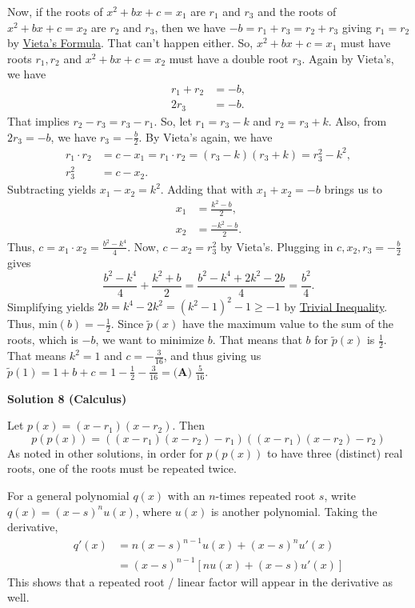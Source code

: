 \begin{enumerate}
 Now, if the roots of $x^2+bx+c=x_1$ are $r_1$ and $r_3$ and the roots of $x^2+bx+c=x_2$ are $r_2$ and $r_3$, then we have $-b = r_1+r_3 = r_2+r_3$ giving $r_1=r_2$ by \href{https://artofproblemsolving.com/wiki/index.php?title=Vieta\%27s\_Formula}{Vieta's Formula}. That can't happen either. So, $x^2+bx+c=x_1$ must have roots $r_1, r_2$ and $x^2+bx+c=x_2$ must have a double root $r_3$. Again by Vieta's, we have
 \begin{align*} r_1+r_2&=-b, \\ 2r_3&=-b. \end{align*}
That implies $r_2-r_3=r_3-r_1$. So, let $r_1=r_3-k$ and $r_2=r_3+k$. Also, from $2r_3=-b$, we have $r_3=-\frac{b}{2}$. By Vieta's again, we have
 \begin{align*} r_1\cdot r_2 &= c-x_1 = r_1\cdot r_2 = (r_3-k)(r_3+k) = r_3^2-k^2, \\ r_3^2&=c-x_2. \end{align*}
Subtracting yields $x_1-x_2=k^2$. Adding that with $x_1+x_2=-b$ brings us to
 \begin{align*} x_1 &= \frac{k^2-b}{2}, \\ x_2 &= \frac{-k^2-b}{2}. \end{align*}
Thus, $c=x_1\cdot x_2=\frac{b^2-k^4}{4}$. Now, $c-x_2 = r_3^2$ by Vieta's. Plugging in $c, x_2, r_3=-\frac{b}{2}$ gives
 \[\frac{b^2-k^4}{4} + \frac{k^2+b}{2} = \frac{b^2-k^4+2k^2-2b}{4} = \frac{b^2}{4}.\]Simplifying yields $2b=k^4-2k^2=(k^2-1)^2-1 \ge -1$ by \href{https://artofproblemsolving.com/wiki/index.php?title=Trivial\_Inequality}{Trivial Inequality}. Thus, $\text{min}(b) = -\frac{1}{2}$. Since $\tilde{p}(x)$ have the maximum value to the sum of the roots, which is $-b$, we want to minimize $b$. That means that $b$ for $\tilde{p}(x)$ is $\frac{1}{2}$. That means $k^2=1$ and $c=-\frac{3}{16}$, and thus giving us $\tilde{p}(1) = 1+b+c = 1-\frac{1}{2}-\frac{3}{16} = \boxed{\textbf{(A) } \frac{5}{16}}$.

 



\textbf{Solution 8 (Calculus)}

Let $p(x)=(x-r_1)(x-r_2)$. Then 
 \[p(p(x)) = ((x-r_1)(x-r_2)-r_1)((x-r_1)(x-r_2)-r_2)\]As noted in other solutions, in order for $p(p(x))$ to have three (distinct) real roots, one of the roots must be repeated twice.

 For a general polynomial $q(x)$ with an $n$-times repeated root $s$, write $q(x)=(x-s)^n u(x)$, where $u(x)$ is another polynomial. Taking the derivative,
 \begin{align*} q'(x)&= n(x-s)^{n-1} u(x) + (x-s)^n u'(x) \\ &= (x-s)^{n-1} \left[nu(x) + (x-s)u'(x)\right] \end{align*}
This shows that a repeated root / linear factor will appear in the derivative as well.


\end{enumerate}
